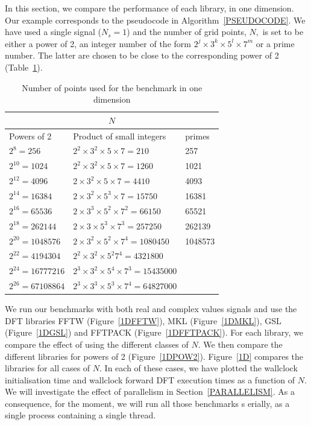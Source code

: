 \documentclass[12pt, a4paper]{article} \setlength{\textheight}{24cm}
\begin{document}
In this section, we compare the performance of each library, in one
dimension.  Our example corresponds to the pseudocode in
Algorithm~\ref{PSEUDOCODE}. We have used a single signal ($N_s=1$) and
the number of grid points, $N,$ is set to be either a power of 2, an
integer number of the form $2^j\times  3^k\times  5^l\times 7^m$ or a prime number. The
latter are chosen to be close to the corresponding power of 2
(Table~\ref{SIZES1D}).
\begin{table}[H]
  \captionsetup{width=0.8\linewidth}
  \centering
  \begin{tabular}{|l|l|l|}
    \hline
    \multicolumn{3}{|c|}{$N$}\\
    \hline
    \hline
    Powers of 2 & Product of small integers & primes\\ \hline
    $2^8=256$	 & $2^2\times 3^2\times 5\times 7=210$	     & 257  \\ \hline
    $2^{10}=1024$	 & $2^2\times 3^2\times 5\times 7=1260$	     & 1021  \\ \hline
    $2^{12}=4096$	 & $2\times 3^2\times 5\times 7=4410$	     & 4093 \\ \hline
    $2^{14}=16384$	 & $2\times 3^2\times 5^3\times 7=15750$	     & 16381 \\ \hline
    $2^{16}=65536$	 & $2\times 3^3\times 5^2\times 7^2=66150$      & 65521 \\ \hline
    $2^{18}=262144$	 & $2\times 3\times 5^3\times 7^3=257250$       & 262139 \\ \hline
    $2^{20}=1048576$  & $2\times 3^2\times 5^2\times 7^4=1080450$    & 1048573 \\ \hline
    $2^{22}=4194304$  & $2^2\times 3^2\times 5^2 7^4=4321800$  &	\\ \hline
    $2^{24}=16777216$ & $2^3\times 3^2\times 5^4\times 7^3=15435000$ &	\\ \hline
    $2^{26}=67108864$ & $2^3\times 3^3\times 5^3\times 7^4=64827000$ &\\ \hline
  \end{tabular}
  \caption{Number of points used for the benchmark in one dimension}\label{SIZES1D}
\end{table}


We run our benchmarks with both real and complex values signals and
use the DFT libraries FFTW (Figure~\ref{1DFFTW}), MKL
(Figure~\ref{1DMKL}), GSL (Figure~\ref{1DGSL}) and FFTPACK
(Figure~\ref{1DFFTPACK}). For each library, we compare the effect of
using the different classes of $N.$ We then compare the different
libraries for powers of 2 (Figure~\ref{1DPOW2}). Figure~\ref{1D} compares the libraries for all cases of $N.$ In each of these cases, we have plotted the
wallclock initialisation time and wallclock forward DFT execution
times as a function of $N.$ We will investigate the effect of
parallelism in Section~\ref{PARALLELISM}. As a consequence, for the
moment, we will run all those benchmarks s erially, as a single
process containing a single thread.
\end{document}
